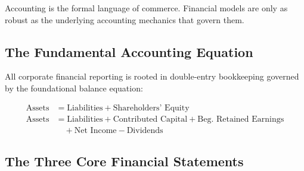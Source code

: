 \documentclass[11pt,a4paper]{article}
\begin{document}
Accounting is the formal language of commerce. Financial models are only as robust as the underlying accounting mechanics that govern them.

\subsection{The Fundamental Accounting Equation}

All corporate financial reporting is rooted in double-entry bookkeeping governed by the foundational balance equation:

\begin{formulabox}
\begin{align}
\text{Assets} &= \text{Liabilities} + \text{Shareholders' Equity} \\[4pt]
\text{Assets} &= \text{Liabilities} + \text{Contributed Capital} + \text{Beg. Retained Earnings} \nonumber \\
              &\quad + \text{Net Income} - \text{Dividends}
\end{align}
\end{formulabox}

\subsection{The Three Core Financial Statements}
\end{document}
